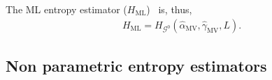\documentclass[journal]{IEEEtran}
\begin{document}
	The ML entropy estimator ($H_{\text{ML}}$)~\cite{CaseBerg01} is, thus,
	\begin{align}
		H_{\text{ML}}=H_{\mathcal G^0}(\widehat{\alpha}_{\text{MV}},\widehat{\gamma}_{\text{MV}},L).
	\end{align}
	
	
	
	
	\subsection{Non parametric entropy estimators}
	\label{nonpar}
	
\end{document}
